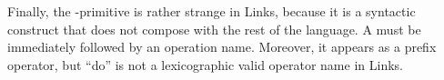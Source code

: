 Finally, the -primitive is rather strange in Links, because it is a syntactic construct that does not compose with the rest of the language. A  must be immediately followed by an operation name. Moreover, it appears as a prefix operator, but ``do'' is not a lexicographic valid operator name in Links. 